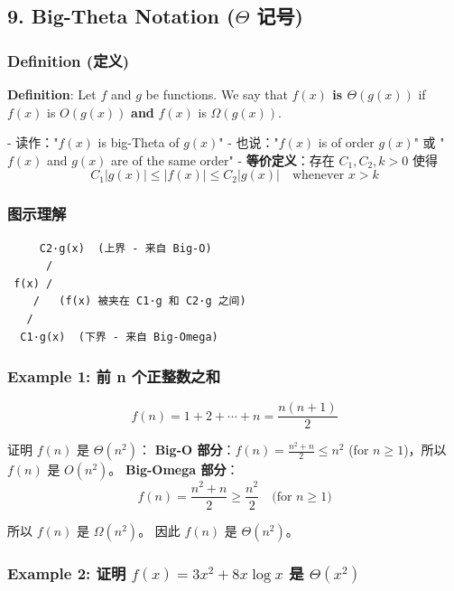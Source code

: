 \documentclass[10pt,a4paper,openany]{ctexbook}
\theoremstyle{definition}
\theoremstyle{remark}
\renewenvironment{quote}
  {\list{}{\leftmargin=1em\rightmargin=0pt\topsep=0.5pt\partopsep=0pt}\item[]}
  {\endlist}
\begin{document}
\vspace{-2pt}

\subsection{9. Big-Theta Notation ($\Theta$ 记号)}

\subsubsection{Definition (定义)}

\begin{quote}
\textbf{Definition}: Let $f$ and $g$ be functions. We say that \textbf{$f(x)$ is $\Theta(g(x))$} if $f(x)$ is $O(g(x))$ \textbf{and} $f(x)$ is $\Omega(g(x))$.

- 读作："$f(x)$ is big-Theta of $g(x)$"
- 也说："$f(x)$ is of order $g(x)$" 或 "$f(x)$ and $g(x)$ are of the same order"
- \textbf{等价定义}：存在 $C_1, C_2, k > 0$ 使得
\[
C_1|g(x)| \leq |f(x)| \leq C_2|g(x)| \quad \text{whenever } x > k
\]


\end{quote}

\subsubsection{图示理解}

{\footnotesize\begin{verbatim}
     C2·g(x)  (上界 - 来自 Big-O)
      / 
 f(x) / 
    /   (f(x) 被夹在 C1·g 和 C2·g 之间)
   / 
  C1·g(x)  (下界 - 来自 Big-Omega)
\end{verbatim}}

\subsubsection{Example 1: 前 n 个正整数之和}

\[
f(n) = 1 + 2 + \cdots + n = \frac{n(n+1)}{2}
\]

证明 $f(n)$ 是 $\Theta(n^2)$：
\textbf{Big-O 部分}：$f(n) = \frac{n^2 + n}{2} \leq n^2$ (for $n \geq 1$)，所以 $f(n)$ 是 $O(n^2)$。
\textbf{Big-Omega 部分}：
\[
f(n) = \frac{n^2 + n}{2} \geq \frac{n^2}{2} \quad \text{(for } n \geq 1\text{)}
\]

所以 $f(n)$ 是 $\Omega(n^2)$。
因此 $f(n)$ 是 $\Theta(n^2)$。
\subsubsection{Example 2: 证明 $f(x) = 3x^2 + 8x \log x$ 是 $\Theta(x^2)$}
\end{document}
